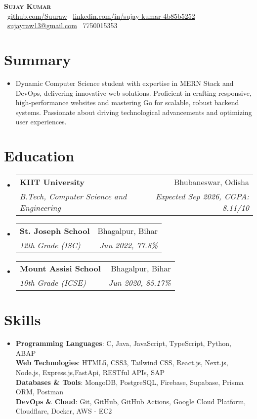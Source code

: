 \documentclass[letterpaper,11pt]{article}
\makeatletter
\newcommand{\resumeSubheading}[4]{
  \vspace{-4pt}\item
  \begin{tabular*}{0.98\textwidth}[t]{l@{\extracolsep{\fill}}r}
    \textbf{#1} & #2 \\
    \textit{\small#3} & \textit{\small #4} \\
  \end{tabular*}\vspace{-8pt}
}
\newcommand{\resumeSubHeadingListStart}{\begin{itemize}[leftmargin=0.1in, label={}]}
\newcommand{\resumeSubHeadingListEnd}{\end{itemize}\vspace{-8pt}}
\makeatother
\begin{document}
\begin{center}
  \textbf{\Huge \scshape Sujay Kumar} \\ \vspace{12pt}
  \small
  \vspace{10pt}
  \faGithub\ \href{https://github.com/Suuraw}{github.com/Suuraw} \quad
  \faLinkedin\ \href{https://linkedin.com/in/sujay-kumar-4b85b5252}{linkedin.com/in/sujay-kumar-4b85b5252} \quad
  \faEnvelope\ \href{mailto:sujayraw13@gmail.com}{sujayraw13@gmail.com} \quad
  \faPhone\ 7750015353
\end{center}
\vspace{-10pt}

\section{Summary}
\vspace{6pt}
\resumeSubHeadingListStart
  \item{Dynamic Computer Science student with expertise in MERN Stack and DevOps, delivering innovative web solutions. Proficient in crafting responsive, high-performance websites and mastering Go for scalable, robust backend systems. Passionate about driving technological advancements and optimizing user experiences.}
\resumeSubHeadingListEnd

\section{Education}
\vspace{6pt}
\resumeSubHeadingListStart
  \resumeSubheading{KIIT University}{Bhubaneswar, Odisha}{B.Tech, Computer Science and Engineering}{Expected Sep 2026, CGPA: 8.11/10}
  \resumeSubheading{St. Joseph School}{Bhagalpur, Bihar}{12th Grade (ISC)}{Jun 2022, 77.8\%}
  \resumeSubheading{Mount Assisi School}{Bhagalpur, Bihar}{10th Grade (ICSE)}{Jun 2020, 85.17\%}
\resumeSubHeadingListEnd

\section{Skills}
\vspace{6pt}
\resumeSubHeadingListStart
  \item{
    \textbf{Programming Languages}: C, Java, JavaScript, TypeScript, Python, ABAP \\ \vspace{2pt}
    \textbf{Web Technologies}: HTML5, CSS3, Tailwind CSS, React.js, Next.js, Node.js, Express.js,FastApi, RESTful APIs, SAP \\ \vspace{2pt}
    \textbf{Databases \& Tools}: MongoDB, PostgreSQL, Firebase, Supabase, Prisma ORM, Postman \\  \vspace{2pt}
    \textbf{DevOps \& Cloud}: Git, GitHub, GitHub Actions, Google Cloud Platform, Cloudflare, Docker, AWS - EC2
  }
\resumeSubHeadingListEnd
\end{document}
